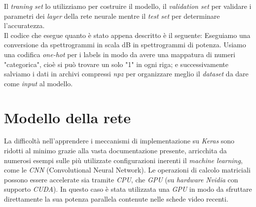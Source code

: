 Il \textit{traning set} lo utilizziamo per costruire il modello, il \textit{validation set} per validare i parametri dei \textit{layer} della rete neurale mentre il \textit{test set} per determinare l'accuratezza.\\
\newline Il codice che esegue quanto è stato appena descritto è il seguente:
\vspace*{2ex}
\vspace*{2ex}
\noindent Eseguiamo una conversione da spettrogrammi in scala dB in spettrogrammi di potenza.
\vspace*{2ex}
\vspace*{2ex}
\noindent Usiamo una codifica \textit{one-hot} per i labels in modo da avere una mappatura di numeri "categorica", cioè si può trovare un solo "1" in ogni riga; e successivamente salviamo i dati in archivi compressi \textit{npz} per organizzare meglio il \textit{dataset} da dare come \textit{input} al modello.
\vspace*{2ex}
\vspace*{2ex}

\section{Modello della rete}
La difficoltà nell’apprendere i meccanismi di implementazione su \textit{Keras} sono ridotti al minimo grazie alla vasta documentazione presente, arricchita da numerosi esempi sulle più utilizzate configurazioni inerenti il \textit{machine learning}, come le \textit{CNN} (Convolutional Neural Network).
Le operazioni di calcolo matriciali possono essere accelerate sia tramite \textit{CPU}, che \textit{GPU} (su \textit{hardware} \textit{Nvidia} con supporto \textit{CUDA}). In questo caso è stata utilizzata una \textit{GPU} in modo da sfruttare direttamente la sua potenza parallela contenute nelle schede video recenti.
\vspace*{2ex}
\vspace*{2ex}

